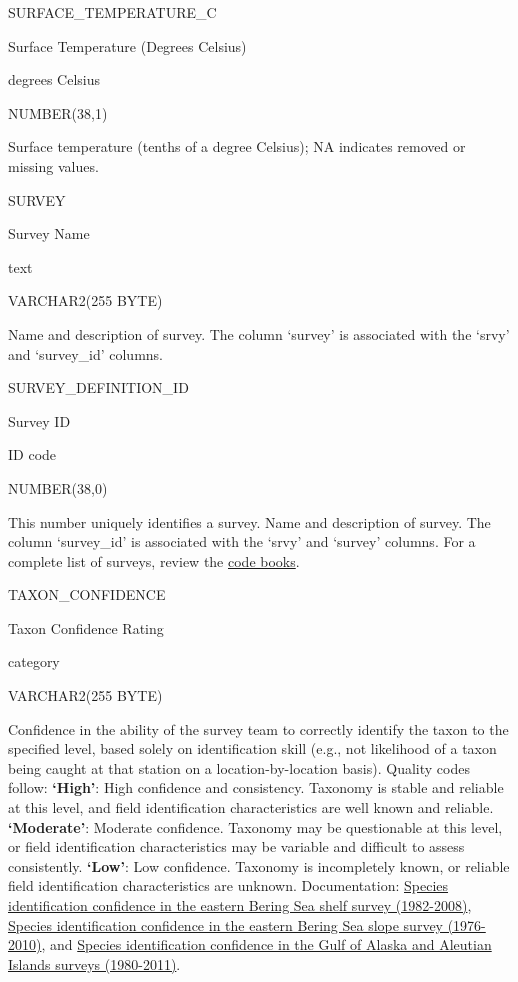 \documentclass[
  letterpaper,
  oneside,
  open=any]{scrbook}
\begin{document}
SURFACE\_TEMPERATURE\_C

Surface Temperature (Degrees Celsius)

degrees Celsius

NUMBER(38,1)

Surface temperature (tenths of a degree Celsius); NA indicates removed
or missing values.

SURVEY

Survey Name

text

VARCHAR2(255 BYTE)

Name and description of survey. The column `survey' is associated with
the `srvy' and `survey\_id' columns.

SURVEY\_DEFINITION\_ID

Survey ID

ID code

NUMBER(38,0)

This number uniquely identifies a survey. Name and description of
survey. The column `survey\_id' is associated with the `srvy' and
`survey' columns. For a complete list of surveys, review the
\href{https://www.fisheries.noaa.gov/resource/document/groundfish-survey-species-code-manual-and-data-codes-manual}{code
books}.

TAXON\_CONFIDENCE

Taxon Confidence Rating

category

VARCHAR2(255 BYTE)

Confidence in the ability of the survey team to correctly identify the
taxon to the specified level, based solely on identification skill
(e.g., not likelihood of a taxon being caught at that station on a
location-by-location basis). Quality codes follow: \textbf{`High'}: High
confidence and consistency. Taxonomy is stable and reliable at this
level, and field identification characteristics are well known and
reliable. \textbf{`Moderate'}: Moderate confidence. Taxonomy may be
questionable at this level, or field identification characteristics may
be variable and difficult to assess consistently. \textbf{`Low'}: Low
confidence. Taxonomy is incompletely known, or reliable field
identification characteristics are unknown. Documentation:
\href{http://apps-afsc.fisheries.noaa.gov/Publications/ProcRpt/PR2009-04.pdf}{Species
identification confidence in the eastern Bering Sea shelf survey
(1982-2008)},
\href{http://apps-afsc.fisheries.noaa.gov/Publications/ProcRpt/PR2014-05.pdf}{Species
identification confidence in the eastern Bering Sea slope survey
(1976-2010)}, and
\href{http://apps-afsc.fisheries.noaa.gov/Publications/ProcRpt/PR2014-01.pdf}{Species
identification confidence in the Gulf of Alaska and Aleutian Islands
surveys (1980-2011)}.
\end{document}
